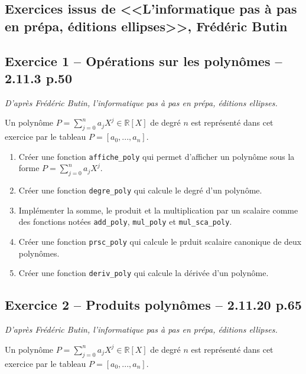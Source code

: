 \documentclass[10pt,fleqn]{article} %
\begin{document}
\begin{multicols}{2}
\end{multicols}


\newpage 


\begin{multicols}{2}

\section{Exercices issus de <<L'informatique pas à pas en prépa, éditions ellipses>>, Frédéric Butin}

\subsection*{Exercice 1 -- Opérations sur les polynômes -- 2.11.3 p.50}
\begin{flushright}
\textit{D'après Frédéric Butin, l'informatique pas à pas en prépa, éditions ellipses.}
\end{flushright}
Un polynôme $P=\sum\limits_{j=0}^{n}a_j X^j \in \mathbb{R}[X]$ de degré $n$ est représenté dans cet exercice par le tableau $P=[a_0,...,a_n]$.

\begin{enumerate}
\item Créer une fonction \texttt{affiche\_poly} qui permet d'afficher un polynôme sous la forme $P=\sum\limits_{j=0}^{n}a_j X^j$.
\item Créer une fonction \texttt{degre\_poly} qui calcule le degré d'un polynôme.
\item Implémenter la somme, le produit et la multiplication par un scalaire comme des fonctions notées \texttt{add\_poly}, \texttt{mul\_poly} et \texttt{mul\_sca\_poly}.
\item Créer une fonction \texttt{prsc\_poly} qui calcule le prduit scalaire canonique de deux polynômes.
\item Créer une fonction \texttt{deriv\_poly} qui calcule la dérivée d'un polynôme.
\end{enumerate}

\subsection*{Exercice 2 -- Produits polynômes -- 2.11.20 p.65}
\begin{flushright}
\textit{D'après Frédéric Butin, l'informatique pas à pas en prépa, éditions ellipses.}
\end{flushright}
Un polynôme $P=\sum\limits_{j=0}^{n}a_j X^j \in \mathbb{R}[X]$ de degré $n$ est représenté dans cet exercice par le tableau $P=[a_0,...,a_n]$.


\end{multicols}
\end{document}
